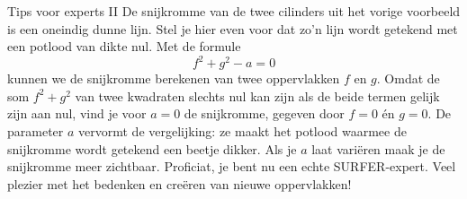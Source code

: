 \begin{surferPage}{Tips voor experts II}
De snijkromme van de twee cilinders uit het vorige voorbeeld is een oneindig dunne lijn. Stel je hier even voor dat zo'n lijn wordt getekend met een potlood van dikte nul. Met de formule
\[ f^2+g^2-a=0\]
kunnen we de snijkromme berekenen van twee oppervlakken $f$ en $g$. Omdat de som $f^2+g^2$ van twee kwadraten slechts nul kan zijn als de beide termen gelijk zijn aan nul, vind je voor $a=0$ de snijkromme, gegeven door $f=0$ \'en $g=0$.
 De parameter $a$ vervormt de vergelijking: ze maakt het potlood waarmee de snijkromme wordt getekend een beetje dikker. Als je $a$ laat vari\"eren maak je de snijkromme meer zichtbaar.
\newline \newline
Proficiat, je bent nu een echte SURFER-expert. Veel plezier met het bedenken en cre\"eren van nieuwe oppervlakken!
\end{surferPage}
